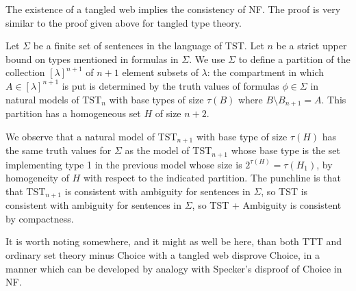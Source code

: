 \documentclass{slides}
\begin{document}
\begin{slide}

The existence of a tangled web implies the consistency of NF.  The proof is very similar to the proof given above for tangled type theory.

Let $\Sigma$ be a finite set of sentences in the language of TST.  Let $n$ be a strict upper bound on types mentioned in formulas in $\Sigma$.  We use $\Sigma$ to define a partition of the collection $[\lambda]^{n+1}$ of $n+1$ element subsets of $\lambda$:  the compartment in which $A \in [\lambda]^{n+1}$ is  put is determined by the truth values of formulas $\phi \in \Sigma$ in
natural models of TST$_n$ with base types of size $\tau(B)$ where $B \setminus B_{n+1}=A$.  This partition has a homogeneous set $H$ of size $n+2$.  

\end{slide}
\begin{slide}

We observe
that a natural model of TST$_{n+1}$ with base type of size $\tau(H)$ has the same truth values for $\Sigma$ as the model of TST$_{n+1}$ whose base type is the set implementing
type 1 in the previous model whose size is $2^{\tau(H)} = \tau(H_1)$, by homogeneity of $H$ with respect to the indicated partition.  The punchline is that that TST$_{n+1}$
is consistent with ambiguity for sentences in $\Sigma$, so TST is consistent with ambiguity for sentences in $\Sigma$, so TST + Ambiguity is consistent by compactness.

It is worth noting somewhere, and it might as well be here, than both TTT and ordinary set theory minus Choice with a tangled web disprove Choice, in a manner which can be developed by analogy with Specker's disproof of Choice in NF.

\end{slide}
\end{document}
